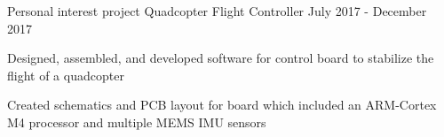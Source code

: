 \begin{cventries}

  \cventry
    {Personal interest project} %
    {Quadcopter Flight Controller} %
    {} %
    {July 2017 - December 2017} %
    {
      \begin{cvitems} %
        \item {Designed, assembled, and developed software for control board to stabilize the flight of a quadcopter}
        \item {Created schematics and PCB layout for board which included an ARM-Cortex M4 processor and multiple MEMS IMU sensors}
      \end{cvitems}
    }


\end{cventries}
